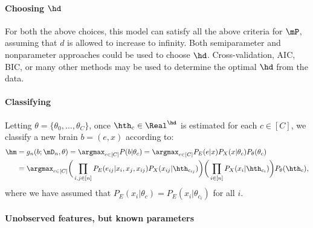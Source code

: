 \paragraph{Choosing $\hd$}

For both the above choices, this model can satisfy all the above criteria for $\mP$, assuming that $d$ is allowed to increase to infinity.  Both semiparameter and nonparameter approaches could be used to choose $\hd$.  Cross-validation, AIC, BIC, or many other methods may be used to determine the optimal $\hd$ from the data. 


\paragraph{Classifying}

Letting $\theta=\{\theta_0,\ldots,\theta_C\}$, once $\hth_c \in \Real^{\hd}$ is estimated for each $c\in[C]$, we classify a new brain $b=(e,x)$ according to:
\begin{align}
	 \hm &= g_n(b; \mD_n, \theta) = \argmax_{c\in[C]} P(b | \theta_c) 
	 	 = \argmax_{c\in[C]}  P_E(e | x)  P_X(x | \theta_c) P_{\theta}(\theta_c) \nonumber \\
		&= \argmax_{c\in[C]}  \bigg(\prod_{i,j \in [n]} P_E(e_{ij} | x_i, x_j, x_{ij}) P_X(x_{ij} | \hth_{c_{ij}})\bigg) \bigg(\prod_{i \in [n]} P_X(x_i | \hth_{c_i})\bigg)  P_{\theta}(\hth_c)
		,
\end{align}
where we have assumed that $P_E(x_i | \theta_c)=P_E(x_i | \theta_{c_i})$ for all $i$.


\paragraph{Unobserved features, but known parameters}

